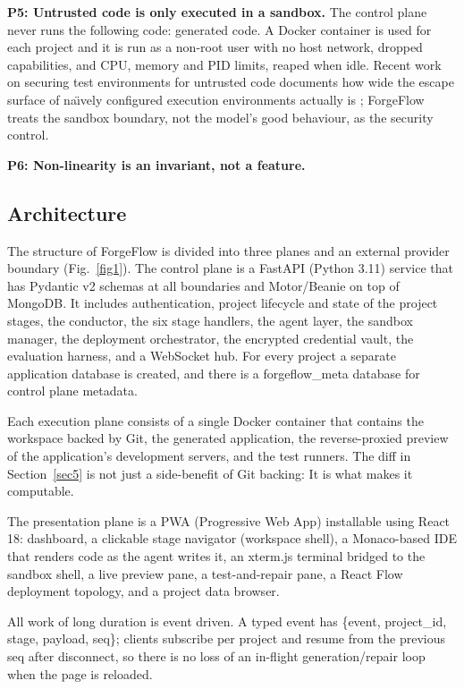 \documentclass[pdflatex,sn-mathphys-num]{sn-jnl}%
\theoremstyle{thmstyleone}%
\theoremstyle{thmstyletwo}%
\theoremstyle{thmstylethree}%
\begin{document}
\textbf{P5: Untrusted code is only executed in a sandbox.} The control plane never runs the following code: generated code. A Docker container is used for each project and it is run as a non-root user with no host network, dropped capabilities, and CPU, memory and PID limits, reaped when idle. Recent work on securing test environments for untrusted code documents how wide the escape surface of na\"{\i}vely configured execution environments actually is \cite{r24rabin}; ForgeFlow treats the sandbox boundary, not the model's good behaviour, as the security control.

\textbf{P6: Non-linearity is an invariant, not a feature.}

\subsection{Architecture}\label{sec3.2}

The structure of ForgeFlow is divided into three planes and an external provider boundary (Fig.~\ref{fig1}). The control plane is a FastAPI (Python 3.11) service that has Pydantic v2 schemas at all boundaries and Motor/Beanie on top of MongoDB. It includes authentication, project lifecycle and state of the project stages, the conductor, the six stage handlers, the agent layer, the sandbox manager, the deployment orchestrator, the encrypted credential vault, the evaluation harness, and a WebSocket hub. For every project a separate application database is created, and there is a forgeflow\_meta database for control plane metadata.

Each execution plane consists of a single Docker container that contains the workspace backed by Git, the generated application, the reverse-proxied preview of the application's development servers, and the test runners. The diff in Section~\ref{sec5} is not just a side-benefit of Git backing: It is what makes it computable.

The presentation plane is a PWA (Progressive Web App) installable using React 18: dashboard, a clickable stage navigator (workspace shell), a Monaco-based IDE that renders code as the agent writes it, an xterm.js terminal bridged to the sandbox shell, a live preview pane, a test-and-repair pane, a React Flow deployment topology, and a project data browser.

All work of long duration is event driven. A typed event has \{event, project\_id, stage, payload, seq\}; clients subscribe per project and resume from the previous seq after disconnect, so there is no loss of an in-flight generation/repair loop when the page is reloaded.
\end{document}
